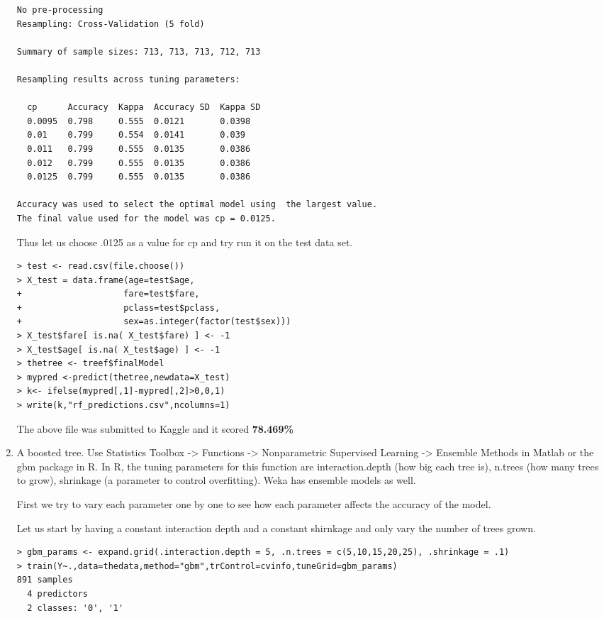 \documentclass[fontsize=10pt]{scrartcl}
\begin{document}
\begin{enumerate}
\begin{verbatim}
No pre-processing
Resampling: Cross-Validation (5 fold) 

Summary of sample sizes: 713, 713, 713, 712, 713 

Resampling results across tuning parameters:

  cp      Accuracy  Kappa  Accuracy SD  Kappa SD
  0.0095  0.798     0.555  0.0121       0.0398  
  0.01    0.799     0.554  0.0141       0.039   
  0.011   0.799     0.555  0.0135       0.0386  
  0.012   0.799     0.555  0.0135       0.0386  
  0.0125  0.799     0.555  0.0135       0.0386  

Accuracy was used to select the optimal model using  the largest value.
The final value used for the model was cp = 0.0125. 
\end{verbatim}
			Thus let us choose .0125 as a value for cp and try run it on the test data set.

\begin{verbatim}
> test <- read.csv(file.choose())
> X_test = data.frame(age=test$age,
+                    fare=test$fare,
+                    pclass=test$pclass,
+                    sex=as.integer(factor(test$sex)))
> X_test$fare[ is.na( X_test$fare) ] <- -1
> X_test$age[ is.na( X_test$age) ] <- -1
> thetree <- treef$finalModel
> mypred <-predict(thetree,newdata=X_test)
> k<- ifelse(mypred[,1]-mypred[,2]>0,0,1)
> write(k,"rf_predictions.csv",ncolumns=1)
\end{verbatim}
			The above file was submitted to Kaggle and it scored \textbf{78.469\%}


			\item
			A boosted tree. Use Statistics Toolbox -> Functions -> Nonparametric Supervised Learning -> Ensemble Methods in Matlab or the gbm package in R. In R, the tuning parameters for this function are interaction.depth (how big each tree is), n.trees (how many trees to grow), shrinkage (a parameter to control overﬁtting). Weka has ensemble models as well.

			First we try to vary each parameter one by one to see how each parameter affects the accuracy of the model.

			Let us start by having a constant interaction depth and a constant shirnkage and only vary the number of trees grown.

\begin{verbatim}
> gbm_params <- expand.grid(.interaction.depth = 5, .n.trees = c(5,10,15,20,25), .shrinkage = .1)
> train(Y~.,data=thedata,method="gbm",trControl=cvinfo,tuneGrid=gbm_params)
891 samples
  4 predictors
  2 classes: '0', '1' 


\end{verbatim}
\end{enumerate}
\end{document}
